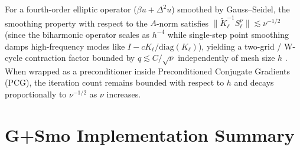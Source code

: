 \documentclass[11pt,a4paper]{article}
\begin{document}
For a fourth-order elliptic operator ($\beta u + \Delta^2 u$) smoothed by Gauss--Seidel, the smoothing property with respect to the $A$-norm satisfies $\|\widetilde{K}_\ell^{-1} S_\ell^\nu\| \lesssim \nu^{-1/2}$ (since the biharmonic operator scales as $h^{-4}$ while single-step point smoothing damps high-frequency modes like $I - c K_\ell / \mathrm{diag}(K_\ell)$), yielding a two-grid / W-cycle contraction factor bounded by $q \lesssim C / \sqrt{\nu}$ independently of mesh size $h$ \cite{SognTakacs}. When wrapped as a preconditioner inside Preconditioned Conjugate Gradients (PCG), the iteration count remains bounded with respect to $h$ and decays proportionally to $\nu^{-1/2}$ as $\nu$ increases.

\section{G+Smo Implementation Summary}
\end{document}
